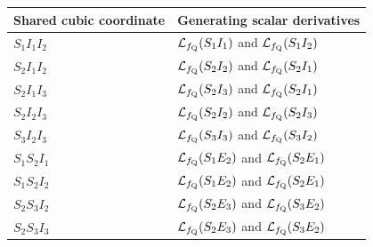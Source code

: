 \begin{center}
\begin{tabular}{@{}p{}p{}@{}}
\toprule
Shared cubic coordinate & Generating scalar derivatives\\
\midrule
$S_1I_1I_2$ & $\LieQ(S_1I_1)$ and $\LieQ(S_1I_2)$ \\
$S_2I_1I_2$ & $\LieQ(S_2I_2)$ and $\LieQ(S_2I_1)$ \\
$S_2I_1I_3$ & $\LieQ(S_2I_3)$ and $\LieQ(S_2I_1)$ \\
$S_2I_2I_3$ & $\LieQ(S_2I_2)$ and $\LieQ(S_2I_3)$ \\
$S_3I_2I_3$ & $\LieQ(S_3I_3)$ and $\LieQ(S_3I_2)$ \\
$S_1S_2I_1$ & $\LieQ(S_1E_2)$ and $\LieQ(S_2E_1)$ \\
$S_1S_2I_2$ & $\LieQ(S_1E_2)$ and $\LieQ(S_2E_1)$ \\
$S_2S_3I_2$ & $\LieQ(S_2E_3)$ and $\LieQ(S_3E_2)$ \\
$S_2S_3I_3$ & $\LieQ(S_2E_3)$ and $\LieQ(S_3E_2)$ \\
\bottomrule
\end{tabular}
\end{center}
